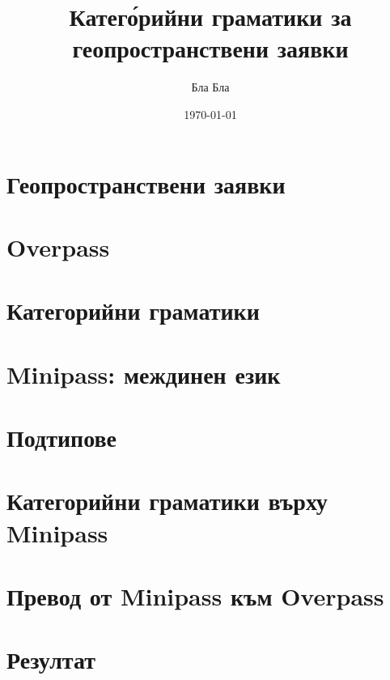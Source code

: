 \documentclass{beamer}
\title{Катег\'орийни граматики за геопространствени заявки}
\date{\today}
\author{Бла Бла}
\institute{Магистър университет ФМИ бла}
\begin{document}
  \maketitle

  \section{Геопространствени заявки}

  \section{Overpass}

  \section{Категорийни граматики}

  \section{Minipass: междинен език}

  \section{Подтипове}

  \section{Категорийни граматики върху Minipass}

  \section{Превод от Minipass към Overpass}

  \section{Резултат}
\end{document}
